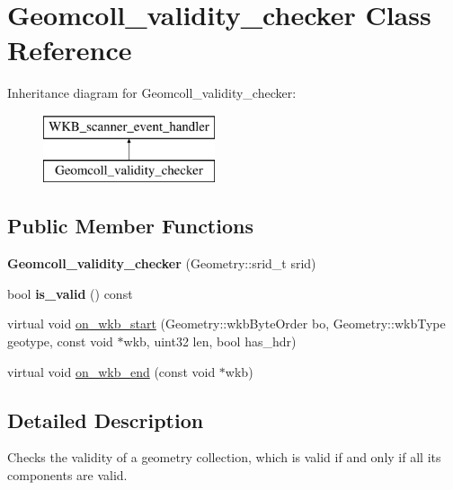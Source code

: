 \hypertarget{classGeomcoll__validity__checker}{}\section{Geomcoll\+\_\+validity\+\_\+checker Class Reference}
\label{classGeomcoll__validity__checker}
Inheritance diagram for Geomcoll\+\_\+validity\+\_\+checker\+:\begin{figure}[H]
\begin{center}
\leavevmode
\includegraphics[height=2.000000cm]{classGeomcoll__validity__checker}
\end{center}
\end{figure}
\subsection*{Public Member Functions}
\begin{DoxyCompactItemize}
\item 
\mbox{\label{classGeomcoll__validity__checker_a6a91e8d2b7527ab66ce059590d601bac}} 
{\bfseries Geomcoll\+\_\+validity\+\_\+checker} (Geometry\+::srid\+\_\+t srid)
\item 
\mbox{\label{classGeomcoll__validity__checker_a4961f3abf371ea14b2e21ebf6c3d387c}} 
bool {\bfseries is\+\_\+valid} () const
\item 
virtual void \mbox{\hyperlink{classGeomcoll__validity__checker_adac22fc99851bc6ef079b7d1ff045abb}{on\+\_\+wkb\+\_\+start}} (Geometry\+::wkb\+Byte\+Order bo, Geometry\+::wkb\+Type geotype, const void $\ast$wkb, uint32 len, bool has\+\_\+hdr)
\item 
virtual void \mbox{\hyperlink{classGeomcoll__validity__checker_ab01b921860de69974b27ba422c55ae82}{on\+\_\+wkb\+\_\+end}} (const void $\ast$wkb)
\end{DoxyCompactItemize}


\subsection{Detailed Description}
Checks the validity of a geometry collection, which is valid if and only if all its components are valid. 

